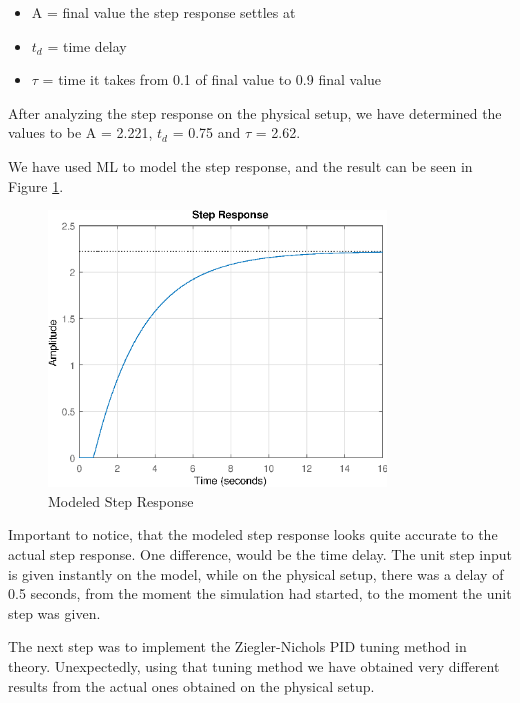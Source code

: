 \begin{itemize}
	\item A = final value the step response settles at
	\item $t_{d}$ = time delay
	\item $\tau$ = time it takes from 0.1 of final value to 0.9 final value
\end{itemize}

After analyzing the step response on the physical setup, we have determined the values to be A = 2.221, 
$t_d$ = 0.75 and $\tau$ = 2.62.

We have used ML to model the step response, and the result can be seen in Figure \ref{fig:modeledStepResponse}.

\begin{figure}[ht]
	\centering
	\includegraphics[width=0.8\textwidth]{figures/06ModelValidation/modeledStepResponse.eps}
	\caption{Modeled Step Response}
	\label{fig:modeledStepResponse}
\end{figure}

Important to notice, that the modeled step response looks quite accurate to the actual step response.
One difference, would be the time delay. The unit step input is given instantly on the model, while on the physical setup,
there was a delay of 0.5 seconds, from the moment the simulation had started, to the moment the unit step was given.

The next step was to implement the Ziegler-Nichols PID tuning method in theory. Unexpectedly, using that tuning
method we have obtained very different results from the actual ones obtained on the physical setup. 

